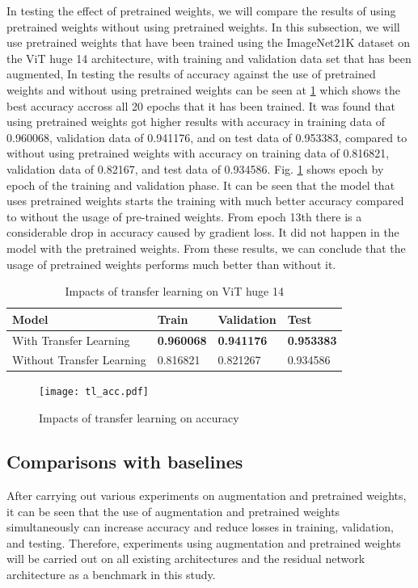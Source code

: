 \documentclass{article}
\begin{document}
In testing the effect of pretrained weights, we will compare the results of using pretrained weights without using pretrained weights. In this subsection, we will use pretrained weights that have been trained using the ImageNet21K dataset on the ViT huge 14 architecture, with training and validation data set that has been augmented,
In testing the results of accuracy against the use of pretrained weights and without using pretrained weights can be seen at \ref{tl_acc_table} which shows the best accuracy accross all 20 epochs that it has been trained. It was found that using pretrained weights got higher results with accuracy in training data of 0.960068, validation data of 0.941176, and on test data of 0.953383, compared to without using pretrained weights with accuracy on training data of 0.816821, validation data of 0.82167, and test data of 0.934586. Fig. \ref{tl_acc_fig} shows epoch by epoch of the training and validation phase. It can be seen that the model that uses pretrained weights starts the training with much better accuracy compared to without the usage of pre-trained weights. From epoch 13th there is a considerable drop in accuracy caused by gradient loss. It did not happen in the model with the pretrained weights. From these results, we can conclude that the usage of pretrained weights performs much better than without it.

\begin{table}[!b]
	\caption{Impacts of transfer learning on ViT huge 14}
	\label{tl_acc_table}
	\centering
	\begin{tabular}{p{4cm}|p{2cm}p{2cm}p{2cm}}
		Model & Train & Validation & Test \\
		\hline
		With Transfer Learning &
		\textbf{0.960068} &
		\textbf{0.941176} &
		\textbf{0.953383}\\
		Without Transfer Learning &
		0.816821 &
		0.821267 &
		0.934586 \\
	\end{tabular}
\end{table}

\begin{figure}[!b]
	\centering
	\texttt{[image: tl\_acc.pdf]}
	\caption{Impacts of transfer learning on accuracy}
	\label{tl_acc_fig}
\end{figure}

\subsection{Comparisons with baselines}
After carrying out various experiments on augmentation and pretrained weights, it can be seen that the use of augmentation and pretrained weights simultaneously can increase accuracy and reduce losses in training, validation, and testing. Therefore, experiments using augmentation and pretrained weights will be carried out on all existing architectures and the residual network architecture as a benchmark in this study.
\end{document}

